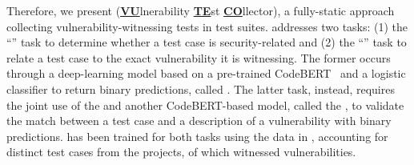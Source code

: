 Therefore, we present \vuteco (\ul{\textbf{VU}}lnerability \ul{\textbf{TE}}st \ul{\textbf{CO}}llector), a fully-static approach collecting vulnerability-witnessing tests in \Java test suites.
\vuteco addresses two tasks: (1) the ``\finding'' task to determine whether a test case is
security-related and (2) the ``\matching'' task to relate a test case to the exact vulnerability it is witnessing.
The former occurs through a deep-learning model based on a pre-trained CodeBERT~\cite{feng:emnlp2020:codebert} and a logistic classifier to return binary predictions, called \finder.
The latter task, instead, requires the joint use of the \finder and another CodeBERT-based model, called the \linker, to validate the match between a test case and a description of a vulnerability with binary predictions.
\vuteco has been trained for both tasks using the data in \VulforJ, accounting for \vulforjTests distinct test cases from the \vulforjProjects projects, of which \vulforjWitTests witnessed \vulforjVulns vulnerabilities.


